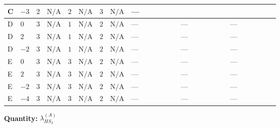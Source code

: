 \documentclass[8pt]{article}
\begin{document}
\begin{landscape}
\begin{longtable}{@{}llcccccc >{\raggedright\arraybackslash}p{0.21\linewidth} >{\raggedright\arraybackslash}p{0.21\linewidth} >{\raggedright\arraybackslash}p{0.21\linewidth}@{}}
\midrule
C & $-3$ & $2$ & $\text{N/A}$ & $2$ & $\text{N/A}$ & $3$ & $\text{N/A}$ & --- & \scriptsize\adjustbox{max width=\linewidth}{$\begin{gathered} -9 {g_2}^2 {\lambda_{HS_2}^{(A)}}\end{gathered}$} & \scriptsize\adjustbox{max width=\linewidth}{$\begin{gathered} +{\lambda_{12}^{(A)}} {\lambda_{HS_1}^{(A)}}\end{gathered}$} \\
\midrule
D & $0$ & $3$ & $\text{N/A}$ & $1$ & $\text{N/A}$ & $2$ & $\text{N/A}$ & --- & --- & --- \\
\midrule
D & $2$ & $3$ & $\text{N/A}$ & $1$ & $\text{N/A}$ & $2$ & $\text{N/A}$ & --- & --- & --- \\
\midrule
D & $-2$ & $3$ & $\text{N/A}$ & $1$ & $\text{N/A}$ & $2$ & $\text{N/A}$ & --- & --- & --- \\
\midrule
E & $0$ & $3$ & $\text{N/A}$ & $3$ & $\text{N/A}$ & $2$ & $\text{N/A}$ & --- & --- & --- \\
\midrule
E & $2$ & $3$ & $\text{N/A}$ & $3$ & $\text{N/A}$ & $2$ & $\text{N/A}$ & --- & --- & --- \\
\midrule
E & $-2$ & $3$ & $\text{N/A}$ & $3$ & $\text{N/A}$ & $2$ & $\text{N/A}$ & --- & --- & --- \\
\midrule
E & $-4$ & $3$ & $\text{N/A}$ & $3$ & $\text{N/A}$ & $2$ & $\text{N/A}$ & --- & --- & --- \\
\midrule
\bottomrule
\end{longtable}
\clearpage
\noindent\textbf{Quantity: }$\lambda_{HS_2}^{(A)}$\par\smallskip

\end{landscape}
\end{document}
